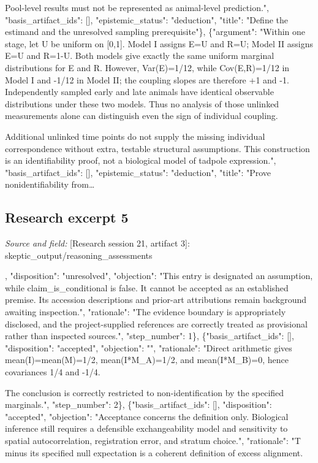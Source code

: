 \documentclass[11pt]{article}
\begin{document}
Pool-level results must not be represented as animal-level prediction.", "basis\_artifact\_ids": [], "epistemic\_status": "deduction", "title": "Define the estimand and the unresolved sampling prerequisite"\}, \{"argument": "Within one stage, let U be uniform on [0,1]. Model I assigns E=U and R=U; Model II assigns E=U and R=1-U. Both models give exactly the same uniform marginal distributions for E and R. However, Var(E)=1/12, while Cov(E,R)=1/12 in Model I and -1/12 in Model II; the coupling slopes are therefore +1 and -1. Independently sampled early and late animals have identical observable distributions under these two models. Thus no analysis of those unlinked measurements alone can distinguish even the sign of individual coupling.

Additional unlinked time points do not supply the missing individual correspondence without extra, testable structural assumptions. This construction is an identifiability proof, not a biological model of tadpole expression.", "basis\_artifact\_ids": [], "epistemic\_status": "deduction", "title": "Prove nonidentifiability from\ldots{}

\subsection{Research excerpt 5}
\textit{Source and field: }[Research session 21, artifact 3]: skeptic\_output/reasoning\_assessments\par
[\{"basis\_artifact\_ids": [], "disposition": "unresolved", "objection": "This entry is designated an assumption, while claim\_is\_conditional is false. It cannot be accepted as an established premise. Its accession descriptions and prior-art attributions remain background awaiting inspection.", "rationale": "The evidence boundary is appropriately disclosed, and the project-supplied references are correctly treated as provisional rather than inspected sources.", "step\_number": 1\}, \{"basis\_artifact\_ids": [], "disposition": "accepted", "objection": "", "rationale": "Direct arithmetic gives mean(I)=mean(M)=1/2, mean(I*M\_A)=1/2, and mean(I*M\_B)=0, hence covariances 1/4 and -1/4.

The conclusion is correctly restricted to non-identification by the specified marginals.", "step\_number": 2\}, \{"basis\_artifact\_ids": [], "disposition": "accepted", "objection": "Acceptance concerns the definition only. Biological inference still requires a defensible exchangeability model and sensitivity to spatial autocorrelation, registration error, and stratum choice.", "rationale": "T minus its specified null expectation is a coherent definition of excess alignment.
\end{document}
